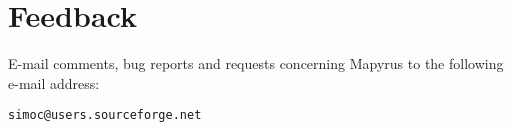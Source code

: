 
\section{Feedback}

E-mail comments, bug reports and requests concerning Mapyrus to
the following e-mail address:

\begin{verbatim}
simoc@users.sourceforge.net
\end{verbatim}

